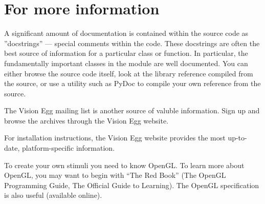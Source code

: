 \documentclass{manual}
\begin{document}
\section{For more information}

A significant amount of documentation is contained within the source
code as ''docstrings'' --- special comments within the code.  These
docstrings are often the best source of information for a particular
class or function. In particular, the fundamentally important classes
in the  module are well documented.  You can
either browse the source code itself, look at the library reference
compiled from the source, or use a utility such as PyDoc to compile
your own reference from the source.

The Vision Egg mailing list is another source of valuble information.
Sign up and browse the archives through the Vision Egg website.

For installation instructions, the Vision Egg website provides the
most up-to-date, platform-specific information.

To create your own stimuli you need to know OpenGL.  To learn more
about OpenGL, you may want to begin with ``The Red Book'' (The OpenGL
Programming Guide, The Official Guide to Learning).  The OpenGL
specification is also useful (available online).


\end{document}
